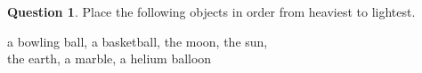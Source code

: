 \documentclass[12pt]{article}
\theoremstyle{definition}
\newtheorem{question}[thm]{Question}
\begin{document}
\begin{question}
	Place the following objects in order from heaviest to lightest.
	\begin{large}
	\begin{center}
		a bowling ball, a basketball, the moon, the sun, \\ the earth, a marble, a helium balloon
	\end{center}
	\end{large}
\end{question}




\end{document}
